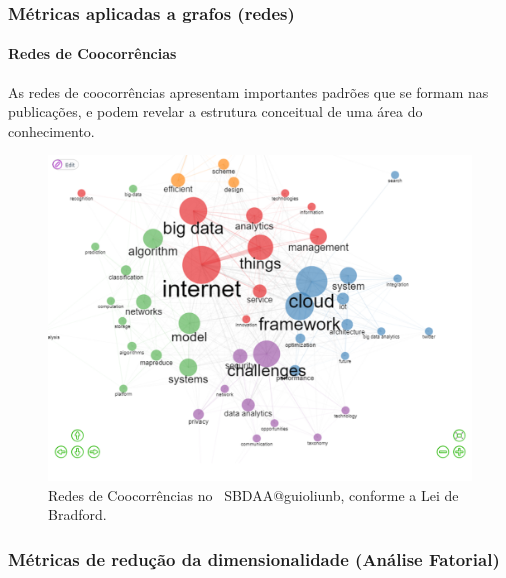 \subsubsection{Métricas aplicadas a grafos (redes)}

\paragraph{Redes de Coocorrências}

As redes de coocorrências apresentam importantes padrões que se formam nas publicações, e podem revelar a estrutura conceitual de uma área do conhecimento.

\begin{figure}
    \centering
    \includegraphics[width=1\textwidth]{experiments/guioliunb/AnaliseBibliometrica/SocialBigDataAnalysis/CO OCCURRRENCE NETWORK.png}
    \caption{Redes de Coocorrências no  \dataset\ SBDAA@guioliunb, conforme a Lei de Bradford.}
    \label{fig:coocorrencias}
\end{figure}



\subsubsection{Métricas de redução da dimensionalidade (Análise Fatorial)}


